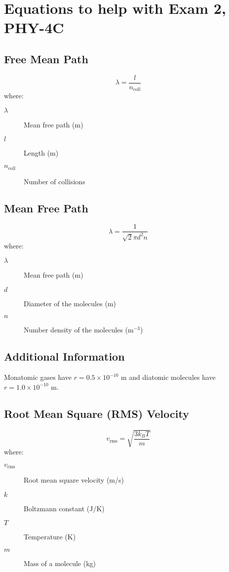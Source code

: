 \documentclass{article}
\begin{document}
\section*{Equations to help with Exam 2, PHY-4C}
\subsection{Free Mean Path}
\begin{equation}
\lambda = \frac{l}{n_{\text{coll}}}
\end{equation}
where:
\begin{description}
    \item[$\lambda$] Mean free path (m)
    \item[$l$] Length (m)
    \item[$n_{\text{coll}}$] Number of collisions
\end{description}


\subsection*{Mean Free Path}
\begin{equation}
\lambda = \frac{1}{\sqrt{2} \pi d^2 n}
\end{equation}
where:
\begin{description}
    \item[$\lambda$] Mean free path (m)
    \item[$d$] Diameter of the molecules (m)
    \item[$n$] Number density of the molecules (m\(^{-3}\))
\end{description}


\subsection*{Additional Information}
Monatomic gases have \( r = 0.5 \times 10^{-10} \) m and diatomic molecules have \( r = 1.0 \times 10^{-10} \) m.

\subsection*{Root Mean Square (RMS) Velocity}
\begin{equation}
    v_{\text{rms}} = \sqrt{\frac{3k_B T}{m}}
    \end{equation}
where:
\begin{description}
    \item[$v_{\text{rms}}$] Root mean square velocity (m/s)
    \item[$k$] Boltzmann constant (J/K)
    \item[$T$] Temperature (K)
    \item[$m$] Mass of a molecule (kg)
\end{description}
\end{document}
